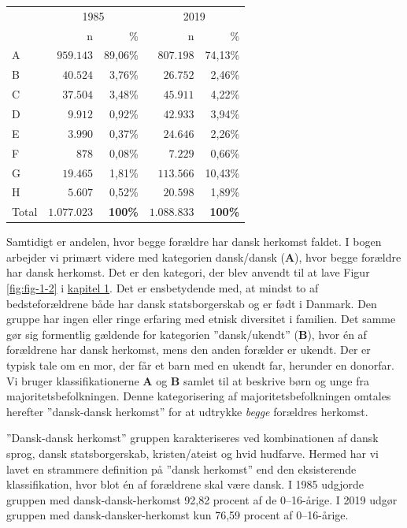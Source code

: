 \documentclass[
]{book}
\begin{document}
\begin{longtable}{l|rrrr}
\toprule
\multicolumn{1}{l}{} & \multicolumn{2}{c}{1985} & \multicolumn{2}{c}{2019} \\ 
\cmidrule(lr){2-3} \cmidrule(lr){4-5}
\multicolumn{1}{l}{} & n & \% & n & \% \\ 
\midrule\addlinespace[2.5pt]
A & $959.143$ & 89,06\% & $807.198$ & 74,13\% \\ 
B & $40.524$ & 3,76\% & $26.752$ & 2,46\% \\ 
C & $37.504$ & 3,48\% & $45.911$ & 4,22\% \\ 
D & $9.912$ & 0,92\% & $42.933$ & 3,94\% \\ 
E & $3.990$ & 0,37\% & $24.646$ & 2,26\% \\ 
F & $878$ & 0,08\% & $7.229$ & 0,66\% \\ 
G & $19.465$ & 1,81\% & $113.566$ & 10,43\% \\ 
H & $5.607$ & 0,52\% & $20.598$ & 1,89\% \\ 
Total & \textbf{$1.077.023$} & \textbf{100\%} & \textbf{$1.088.833$} & \textbf{100\%} \\ 
\bottomrule
\end{longtable}

Samtidigt er andelen, hvor begge forældre har dansk herkomst faldet. I bogen arbejder vi primært videre med kategorien dansk/dansk (\textbf{A}), hvor begge forældre har dansk herkomst. Det er den kategori, der blev anvendt til at lave Figur \ref{fig:fig-1-2} i \hyperref[kap1]{kapitel 1}. Det er ensbetydende med, at mindst to af bedsteforældrene både har dansk statsborgerskab og er født i Danmark. Den gruppe har ingen eller ringe erfaring med etnisk diversitet i familien. Det samme gør sig formentlig gældende for kategorien ''dansk/ukendt'' (\textbf{B}), hvor én af forældrene har dansk herkomst, mens den anden forælder er ukendt. Der er typisk tale om en mor, der får et barn med en ukendt far, herunder en donorfar. Vi bruger klassifikationerne \textbf{A} og \textbf{B} samlet til at beskrive børn og unge fra majoritetsbefolkningen. Denne kategorisering af majoritetsbefolkningen omtales herefter ''dansk-dansk herkomst'' for at udtrykke \emph{begge} forældres herkomst.

''Dansk-dansk herkomst'' gruppen karakteriseres ved kombinationen af dansk sprog, dansk statsborgerskab, kristen/ateist og hvid hudfarve. Hermed har vi lavet en strammere definition på ''dansk herkomst'' end den eksisterende klassifikation, hvor blot én af forældrene skal være dansk. I 1985 udgjorde gruppen med dansk-dansk-herkomst 92,82 procent af de 0--16-årige. I 2019 udgør gruppen med dansk-dansker-herkomst kun 76,59 procent af 0--16-årige.
\end{document}
